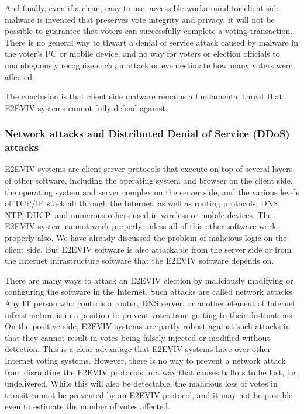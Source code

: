 And finally, even if a clean, easy to use, accessible workaround for
client side malware is invented that preserves vote integrity and
privacy, it will not be possible to guarantee that voters can
successfully complete a voting transaction. There is no general way to
thwart a denial of service attack caused by malware in the voter's PC
or mobile device, and no way for voters or election officials to
unambiguously recognize such an attack or even estimate how many
voters were affected.  

The conclusion is that client side malware remains a fundamental
threat that E2EVIV systems cannot fully defend against.

\subsubsection{Network attacks and Distributed Denial of Service
  (DDoS) attacks}

E2EVIV systems are client-server protocols that execute on top of
several layers of other software, including the operating system and
browser on the client side, the operating system and server complex on
the server side, and the various levels of TCP/IP stack all through
the Internet, as well as routing protocols, DNS, NTP, DHCP, and
numerous others used in wireless or mobile devices. The E2EVIV system
cannot work properly unless all of this other software works properly
also. We have already discussed the problem of malicious logic on the
client side. But E2EVIV software is also attackable from the server
side or from the Internet infrastructure software that the E2EVIV
software depends on.

There are many ways to attack an E2EVIV election by maliciously
modifying or configuring the software in the Internet. Such attacks
are called network attacks. Any IT person who controls a router, DNS
server, or another element of Internet infrastructure is in a position
to prevent votes from getting to their destinations.  On the positive
side, E2EVIV systems are partly robust against such attacks in that
they cannot result in votes being falsely injected or modified without
detection. This is a clear advantage that E2EVIV systems have over
other Internet voting systems. However, there is no way to prevent a
network attack from disrupting the E2EVIV protocols in a way that
causes ballots to be lost, i.e. undelivered.  While this will also be
detectable, the malicious loss of votes in transit cannot be prevented
by an E2EVIV protocol, and it may not be possible even to estimate the
number of votes affected.

